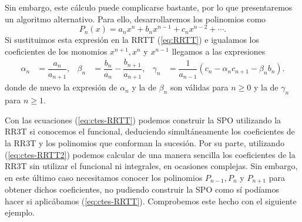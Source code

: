 Sin embargo, este cálculo puede complicarse bastante, por lo que presentaremos un algoritmo alternativo. Para ello, desarrollaremos los polinomios como
$$
P_n(x) = a_n x^n + b_n x^{n-1} + c_n x^{n-2} + \cdots.
$$
Si sustituimos esta expresión en la RRTT (\ref{eq:RRTT}) e igualamos los coeficientes de los monomios $x^{n+1}, x^n$ y $x^{n-1}$ llegamos a las expresiones
\begin{align}
    \label{eq:ctes-RRTT2}
    \alpha_n &= \dfrac{a_n}{a_{n+1}}, & \beta_n &= \dfrac{b_n}{a_n}-\dfrac{b_{n+1}}{a_{n+1}}, & \gamma_n &= \dfrac{1}{a_{n-1}}\left(c_n - \alpha_n c_{n+1} - \beta_n b_n\right).
\end{align}
donde de nuevo la expresión de $\alpha_n$ y la de $\beta_n$ son válidas para $n\geq 0$ y la de $\gamma_n$ para $n\geq 1$.

Con las ecuaciones (\ref{eq:ctes-RRTT}) podemos construir la SPO utilizando la RR3T si conocemos el funcional, deduciendo simultáneamente los coeficientes de la RR3T y los polinomios que conforman la sucesión. Por su parte, utilizando (\ref{eq:ctes-RRTT2}) podemos calcular de una manera sencilla los coeficientes de la RR3T sin utilizar el funcional ni integrales, en ocasiones complejas. Sin embargo, en este último caso necesitamos conocer los polinomios $P_{n-1}, P_n$ y $P_{n+1}$ para obtener dichos coeficientes, no pudiendo construir la SPO como sí podíamos hacer si aplicábamos (\ref{eq:ctes-RRTT}). Comprobemos este hecho con el siguiente ejemplo.

